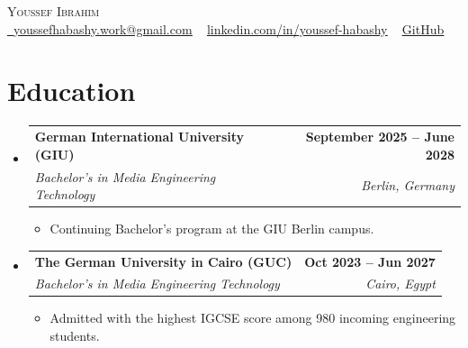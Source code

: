 \documentclass[letterpaper,10.5pt]{article}
\makeatletter
\newcommand{\resumeItem}[1]{
  \item\small{{#1 \vspace{-3pt}}}
}
\newcommand{\resumeSubheading}[4]{
  \vspace{-3pt}\item
    \begin{tabular*}{1.0\textwidth}[t]{l@{\extracolsep{\fill}}r}
      \textbf{#1} & \textbf{\small #2} \\
      \textit{\small#3} & \textit{\small #4} \\
    \end{tabular*}\vspace{-8pt}
}
\newcommand{\resumeSubHeadingListStart}{\begin{itemize}[leftmargin=0.0in, label={}]}
\newcommand{\resumeSubHeadingListEnd}{\end{itemize}}
\newcommand{\resumeItemListStart}{\begin{itemize}}
\newcommand{\resumeItemListEnd}{\end{itemize}\vspace{-6pt}}
\makeatother
\begin{document}
\begin{center}
    {\Huge \scshape Youssef Ibrahim} \\
    \vspace{4pt}
    \href{mailto:youssefhabashy.work@gmail.com}{\raisebox{-0.2\height}\faEnvelope\ \underline{youssefhabashy.work@gmail.com}} ~
    \href{https://www.linkedin.com/in/youssef-habashy/}{\underline{linkedin.com/in/youssef-habashy}} ~
    \href{https://github.com/MintyGreen05?tab=repositories}{\underline{GitHub}}
    \vspace{-8pt}
\end{center}

\section{Education}
  \resumeSubHeadingListStart
    \resumeSubheading
      {German International University (GIU)}{September 2025 -- June 2028}
      {Bachelor's in Media Engineering Technology}{Berlin, Germany}
      \resumeItemListStart
      \resumeItem{Continuing Bachelor's program at the GIU Berlin campus.}
      \resumeItemListEnd 
    \resumeSubheading
      {The German University in Cairo (GUC)}{Oct 2023 -- Jun 2027}
      {Bachelor's in Media Engineering Technology}{Cairo, Egypt}
      \resumeItemListStart
        \resumeItem{Admitted with the highest IGCSE score among 980 incoming engineering students.}
      \resumeItemListEnd
  \resumeSubHeadingListEnd
\vspace{-10pt}

\end{document}
